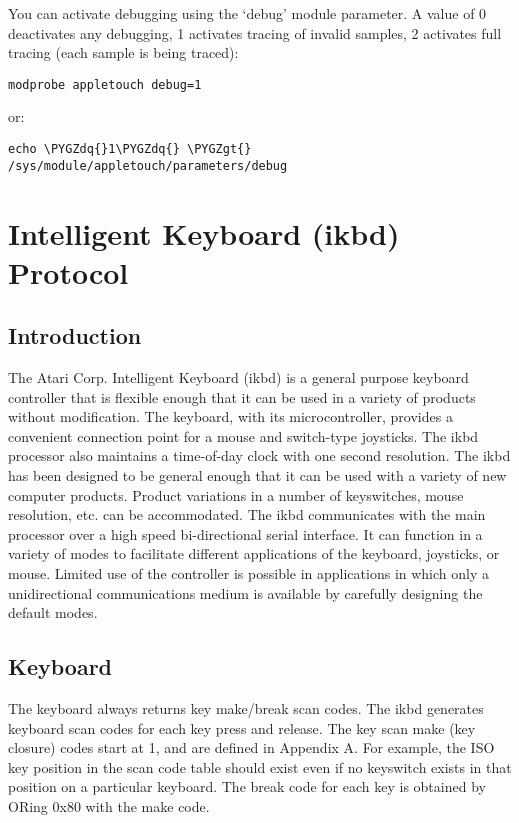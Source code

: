 \documentclass[a4paper,8pt,english]{sphinxmanual}
\def\PYGZgt{\char`\>}
\def\PYGZdq{\char`\"}
\begin{document}
You can activate debugging using the `debug' module parameter. A value of 0
deactivates any debugging, 1 activates tracing of invalid samples, 2 activates
full tracing (each sample is being traced):

\begin{Verbatim}[commandchars=\\\{\}]
modprobe appletouch debug=1
\end{Verbatim}

or:

\begin{Verbatim}[commandchars=\\\{\}]
echo \PYGZdq{}1\PYGZdq{} \PYGZgt{} /sys/module/appletouch/parameters/debug
\end{Verbatim}


\section{Intelligent Keyboard (ikbd) Protocol}
\label{input/devices/atarikbd:intelligent-keyboard-ikbd-protocol}\label{input/devices/atarikbd::doc}

\subsection{Introduction}
\label{input/devices/atarikbd:introduction}
The Atari Corp. Intelligent Keyboard (ikbd) is a general purpose keyboard
controller that is flexible enough that it can be used in a variety of
products without modification. The keyboard, with its microcontroller,
provides a convenient connection point for a mouse and switch-type joysticks.
The ikbd processor also maintains a time-of-day clock with one second
resolution.
The ikbd has been designed to be general enough that it can be used with a
variety of new computer products. Product variations in a number of
keyswitches, mouse resolution, etc. can be accommodated.
The ikbd communicates with the main processor over a high speed bi-directional
serial interface. It can function in a variety of modes to facilitate
different applications of the keyboard,  joysticks, or mouse. Limited use of
the controller is possible in applications in which only a unidirectional
communications medium is available by carefully designing the default modes.


\subsection{Keyboard}
\label{input/devices/atarikbd:keyboard}
The keyboard always returns key make/break scan codes. The ikbd generates
keyboard scan codes for each key press and release. The key scan make (key
closure) codes start at 1, and are defined in Appendix A. For example, the
ISO key position in the scan code table should exist even if no keyswitch
exists in that position on a particular keyboard. The break code for each key
is obtained by ORing 0x80 with the make code.
\end{document}
